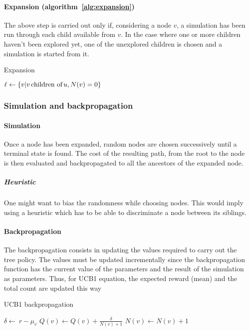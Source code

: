 \documentclass[oneside,twocolumn]{article}
\begin{document}
\paragraph{Expansion (algorithm~\ref{alg:expansion})}
The above step is carried out only if, considering a node \(v\), a simulation
has been run through each child available from \(v\). In the case where one or
more children haven't been explored yet, one of the unexplored children is
chosen and a simulation is started from it.
\begin{algorithm}
  \caption{Expansion}\label{alg:expansion}
  \begin{algorithmic}
    \State{}$\ell \gets \{ v | v \text{\,children of\,} u, N(v) = 0 \}$
    \State{}
    \EndFunction{}
  \end{algorithmic}
\end{algorithm}

\subsubsection{Simulation and backpropagation}
\paragraph{Simulation}
Once a node has been expanded, random nodes are chosen successively until a
terminal state is found. The cost of the resulting path, from the root to the
node is then evaluated and backpropagated to all the ancestors of the expanded
node.

\subparagraph{Heuristic} One might want to bias the randomness while choosing
nodes. This would imply using a heuristic which has to be able to discriminate
a node between its siblings.

\paragraph{Backpropagation}
The backpropagation consists in updating the values required to carry out the
tree policy. The values must be updated incrementally since the backpropagation
function has the current value of the parameters and the result of the
simulation as parameters. Thus, for UCB1 equation, the expected reward (mean)
and the total count are updated this way
\begin{algorithm}
  \caption{UCB1 backpropagation}
  \begin{algorithmic}
    \State{}\(\delta \gets\ r - \mu_v\)
    \State{}\(Q(v) \gets Q(v) + \frac{\delta}{N(v) + 1}\)
    \State{}\(N(v) \gets N(v) + 1\)
    \EndProcedure{}
  \end{algorithmic}
\end{algorithm}
\end{document}
